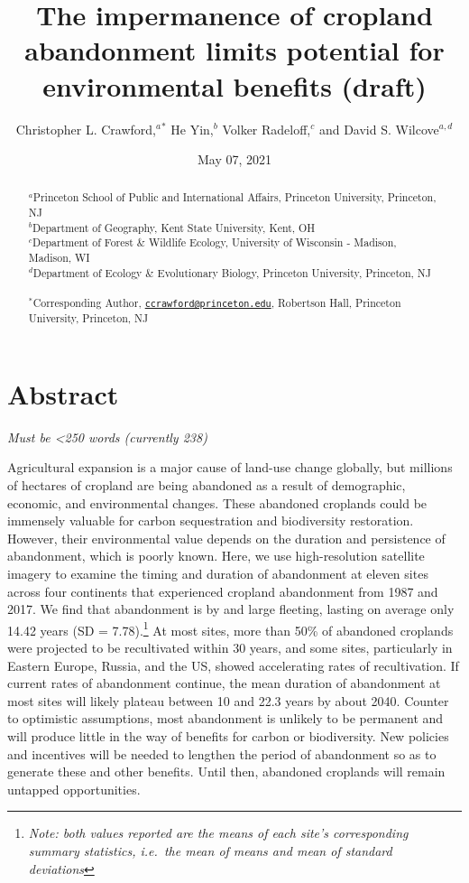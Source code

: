 \documentclass[
]{article}
\title{The impermanence of cropland abandonment limits potential for environmental benefits (draft)}
\author{Christopher L. Crawford,\(^a\)\(^*\) He Yin,\(^b\) Volker Radeloff,\(^c\) and David S. Wilcove\(^{a, d}\)}
\date{May 07, 2021}
\begin{document}
\maketitle
\begin{abstract}
\(^a\)Princeton School of Public and International Affairs, Princeton University, Princeton, NJ\\
\(^b\)Department of Geography, Kent State University, Kent, OH\\
\(^c\)Department of Forest \& Wildlife Ecology, University of Wisconsin - Madison, Madison, WI\\
\(^d\)Department of Ecology \& Evolutionary Biology, Princeton University, Princeton, NJ\\
~\\
\(^*\)Corresponding Author, \href{mailto:ccrawford@princeton.edu}{\nolinkurl{ccrawford@princeton.edu}}, Robertson Hall, Princeton University, Princeton, NJ
\end{abstract}

{
\setcounter{tocdepth}{2}
\tableofcontents
}
\hypertarget{abstract}{%
\section{Abstract}\label{abstract}}

\emph{Must be \textless250 words (currently 238)}

Agricultural expansion is a major cause of land-use change globally, but millions of hectares of cropland are being abandoned as a result of demographic, economic, and environmental changes.
These abandoned croplands could be immensely valuable for carbon sequestration and biodiversity restoration.
However, their environmental value depends on the duration and persistence of abandonment, which is poorly known.
Here, we use high-resolution satellite imagery to examine the timing and duration of abandonment at eleven sites across four continents that experienced cropland abandonment from 1987 and 2017.
We find that abandonment is by and large fleeting, lasting on average only 14.42 years (SD = 7.78).\footnote{\emph{Note: both values reported are the means of each site's corresponding summary statistics, i.e.~the mean of means and mean of standard deviations}}
At most sites, more than 50\% of abandoned croplands were projected to be recultivated within 30 years, and some sites, particularly in Eastern Europe, Russia, and the US, showed accelerating rates of recultivation.
If current rates of abandonment continue, the mean duration of abandonment at most sites will likely plateau between 10 and 22.3 years by about 2040.
Counter to optimistic assumptions, most abandonment is unlikely to be permanent and will produce little in the way of benefits for carbon or biodiversity.
New policies and incentives will be needed to lengthen the period of abandonment so as to generate these and other benefits.
Until then, abandoned croplands will remain untapped opportunities.
\end{document}
